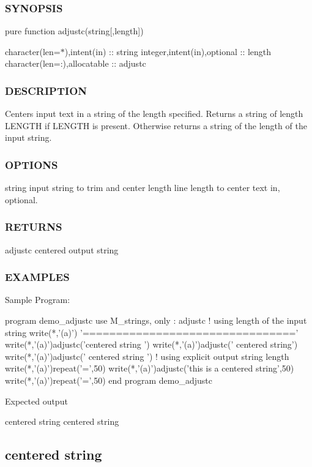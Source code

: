 \subsubsection*{S\+Y\+N\+O\+P\+S\+IS}

pure function adjustc(string\mbox{[},length\mbox{]})

character(len=$\ast$),intent(in) \+:\+: string integer,intent(in),optional \+:\+: length character(len=\+:),allocatable \+:\+: adjustc \subsubsection*{D\+E\+S\+C\+R\+I\+P\+T\+I\+ON}

Centers input text in a string of the length specified. Returns a string of length L\+E\+N\+G\+TH if L\+E\+N\+G\+TH is present. Otherwise returns a string of the length of the input string. \subsubsection*{O\+P\+T\+I\+O\+NS}

string input string to trim and center length line length to center text in, optional. \subsubsection*{R\+E\+T\+U\+R\+NS}

adjustc centered output string

\subsubsection*{E\+X\+A\+M\+P\+L\+ES}

Sample Program\+: \begin{DoxyVerb}program demo_adjustc
use M_strings, only : adjustc
!  using length of the input string
   write(*,'(a)')       '================================'
   write(*,'(a)')adjustc('centered string                 ')
   write(*,'(a)')adjustc('                 centered string')
   write(*,'(a)')adjustc('  centered string               ')
!  using explicit output string length
   write(*,'(a)')repeat('=',50)
   write(*,'(a)')adjustc('this is a centered string',50)
   write(*,'(a)')repeat('=',50)
end program demo_adjustc
\end{DoxyVerb}


Expected output 

 centered string centered string \subsection*{centered string }

